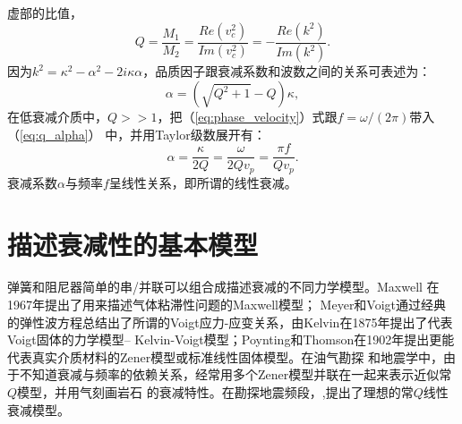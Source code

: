 虚部的比值，
\begin{equation}
	Q=\frac{M_1}{M_2}=\frac{Re(v_c^2)}{Im(v_c^2)}=-\frac{Re(k^2)}{Im(k^2)}.
	\label{eq:qm}
\end{equation}
因为$k^2=\kappa^2-\alpha^2-2i\kappa\alpha$，品质因子跟衰减系数和波数之间的关系可表述为：
\begin{equation}
	\alpha=(\sqrt{Q^2+1}-Q)\kappa,
	\label{eq:q_alpha}
\end{equation}
在低衰减介质中，$Q>>1$，把（\ref{eq:phase_velocity}）式跟$f=\omega/(2\pi)$带入（\ref{eq:q_alpha}）
中，并用Taylor级数展开有：
\begin{equation}
	\alpha=\frac{\kappa}{2Q}=\frac{\omega}{2Qv_p}=\frac{\pi f}{Qv_p}.
	\label{eq:linear_visco}
\end{equation}
衰减系数$\alpha$与频率$f$呈线性关系，即所谓的线性衰减。

\section{描述衰减性的基本模型}
\vspace{0.2cm}
弹簧和阻尼器简单的串/并联可以组合成描述衰减的不同力学模型。Maxwell 在1967年提出了用来描述气体粘滞性问题的Maxwell模型；
Meyer和Voigt通过经典的弹性波方程总结出了所谓的Voigt应力-应变关系，由Kelvin在1875年提出了代表Voigt固体的力学模型--
Kelvin-Voigt模型；Poynting和Thomson在1902年提出更能代表真实介质材料的Zener模型或标准线性固体模型。在油气勘探
和地震学中，由于不知道衰减与频率的依赖关系，经常用多个Zener模型并联在一起来表示近似常$Q$模型，并用气刻画岩石
的衰减特性。在勘探地震频段，,提出了理想的常$Q$线性衰减模型。

